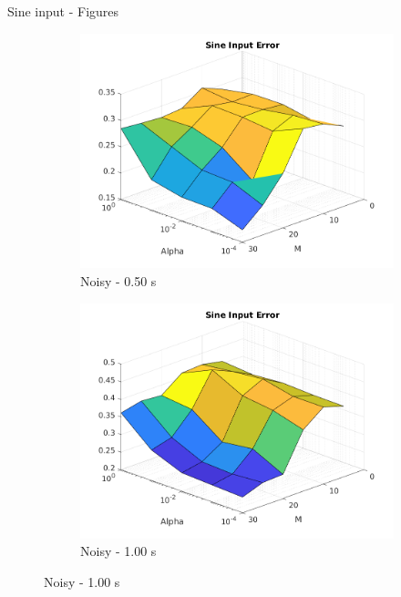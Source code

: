 \documentclass{beamer}
\begin{document}
\begin{frame}{Sine input - Figures}
\begin{figure}
        \hfill
        \begin{subfigure}[b]{0.3\textwidth}
            \centering
            \includegraphics[width=\textwidth]{Figures_Noisy/figure_sine_T_0.50.png}
            \caption{Noisy - 0.50 s}
            \label{fig:noisy_sine_050}
        \end{subfigure}
        \hfill
        \begin{subfigure}[b]{0.3\textwidth}
            \centering
            \includegraphics[width=\textwidth]{Figures_Noisy/figure_sine_T_1.00.png}
            \caption{Noisy - 1.00 s}
            \label{fig:noisy_sine_100}
        \end{subfigure}
        \label{fig:clean_sine}
    \end{figure}
\end{frame}
\end{document}
